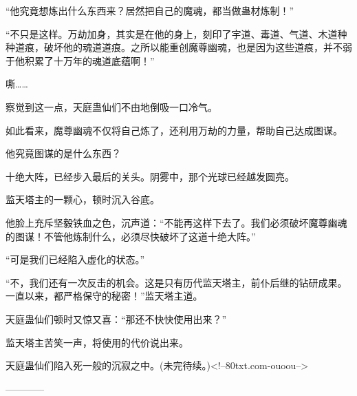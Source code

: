 \begin{this_body}
“他究竟想炼出什么东西来？居然把自己的魔魂，都当做蛊材炼制！”

“不只是这样。万劫加身，其实是在他的身上，刻印了宇道、毒道、气道、木道种种道痕，破坏他的魂道道痕。之所以能重创魔尊幽魂，也是因为这些道痕，并不弱于他积累了十万年的魂道底蕴啊！”

嘶……

察觉到这一点，天庭蛊仙们不由地倒吸一口冷气。

如此看来，魔尊幽魂不仅将自己炼了，还利用万劫的力量，帮助自己达成图谋。

他究竟图谋的是什么东西？

十绝大阵，已经步入最后的关头。阴雾中，那个光球已经越发圆亮。

监天塔主的一颗心，顿时沉入谷底。

他脸上充斥坚毅铁血之色，沉声道：“不能再这样下去了。我们必须破坏魔尊幽魂的图谋！不管他炼制什么，必须尽快破坏了这道十绝大阵。”

“可是我们已经陷入虚化的状态。”

“不，我们还有一次反击的机会。这是只有历代监天塔主，前仆后继的钻研成果。一直以来，都严格保守的秘密！”监天塔主道。

天庭蛊仙们顿时又惊又喜：“那还不快快使用出来？”

监天塔主苦笑一声，将使用的代价说出来。

天庭蛊仙们陷入死一般的沉寂之中。(未完待续。)<!--80txt.com-ouoou-->

------------

\end{this_body}

